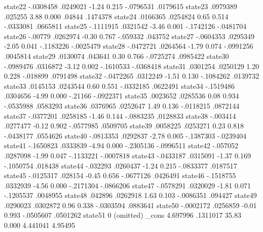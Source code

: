      state22 {\VBAR}  -.0308458   .0249021    -1.24   0.215    -.0796531    .0179615
     state23 {\VBAR}   .0979389    .025255     3.88   0.000       .04844    .1474378
     state24 {\VBAR}   .0166365   .0254824     0.65   0.514    -.0333081    .0665811
     state25 {\VBAR}  -.1111915   .0321542    -3.46   0.001    -.1742126   -.0481704
     state26 {\VBAR}    -.00779   .0262974    -0.30   0.767     -.059332     .043752
     state27 {\VBAR}  -.0604353   .0295349    -2.05   0.041    -.1183226   -.0025479
     state28 {\VBAR}  -.0472721   .0264564    -1.79   0.074    -.0991256    .0045814
     state29 {\VBAR}   .0130074    .043641     0.30   0.766    -.0725274    .0985422
     state30 {\VBAR}  -.0989476   .0316872    -3.12   0.002    -.1610533   -.0368418
     state31 {\VBAR}   .0301254   .0250129     1.20   0.228     -.018899    .0791498
     state32 {\VBAR}  -.0472265   .0312249    -1.51   0.130    -.1084262    .0139732
     state33 {\VBAR}   .0145153   .0243544     0.60   0.551    -.0332185    .0622491
     state34 {\VBAR}  -.1519486   .0304656    -4.99   0.000      -.21166   -.0922371
     state35 {\VBAR}   .0023652   .0285536     0.08   0.934    -.0535988    .0583293
     state36 {\VBAR}   .0376965   .0252647     1.49   0.136    -.0118215    .0872144
     state37 {\VBAR}  -.0377201   .0258185    -1.46   0.144    -.0883235    .0128833
     state38 {\VBAR}   -.003414   .0277477    -0.12   0.902    -.0577985    .0509705
     state39 {\VBAR}   .0058225   .0253271     0.23   0.818    -.0438177    .0554626
     state40 {\VBAR}  -.0813353   .0292837    -2.78   0.005    -.1387303   -.0239404
     state41 {\VBAR}  -.1650823   .0333839    -4.94   0.000    -.2305136   -.0996511
     state42 {\VBAR}   -.057052   .0287098    -1.99   0.047    -.1133221   -.0007818
     state43 {\VBAR}  -.0433187   .0315091    -1.37   0.169    -.1050754     .018438
     state44 {\VBAR}   -.032293   .0260437    -1.24   0.215    -.0833377    .0187517
     state45 {\VBAR}  -.0125317    .028154    -0.45   0.656    -.0677126    .0426491
     state46 {\VBAR}  -.1518755   .0332939    -4.56   0.000    -.2171304   -.0866206
     state47 {\VBAR}  -.0578291   .0320029    -1.81   0.071    -.1205537    .0048955
     state48 {\VBAR}    .042896   .0262918     1.63   0.103    -.0086351     .094427
     state49 {\VBAR}   .0290023   .0302872     0.96   0.338    -.0303594    .0883641
     state50 {\VBAR}  -.0002172   .0256859    -0.01   0.993    -.0505607    .0501262
     state51 {\VBAR}          0  (omitted)
       _cons {\VBAR}   4.697996   .1311017    35.83   0.000     4.441041     4.95495
